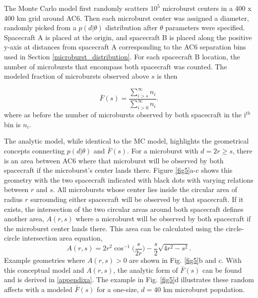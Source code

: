 \documentclass[draft]{agujournal2019}
\begin{document}
The Monte Carlo model first randomly scatters $10^5$ microburst centers in a 400 x 400 km grid around AC6. Then each microburst center was assigned a diameter, randomly picked from a $p(d | \theta)$ distribution after $\theta$ parameters were specified. Spacecraft A is placed at the origin, and spacecraft B is placed along the positive y-axis at distances from spacecraft A corresponding to the AC6 separation bins used in Section \ref{microburst_distribution}. For each spacecraft B location, the number of microbursts that encompass both spacecraft was counted. The modeled fraction of microbursts observed above $s$ is then

\begin{equation}
\bar{F}(s) = \frac{\displaystyle\sum_{i > s}^\infty n_{i} }{ \displaystyle\sum_{i > 0}^\infty n_{i} }.
\end{equation} where as before the number of microbursts observed by both spacecraft in the i$^{th}$ bin is $n_{i}$.

The analytic model, while identical to the MC model, highlights the geometrical concepts connecting $p(d | \theta)$ and $\bar{F}(s)$. For a microburst with $d = 2r \geq s$, there is an area between AC6 where that microburst will be observed by both spacecraft if the microburst's center lands there. Figure \ref{fig5}a-c shows this geometry with the two spacecraft indicated with black dots with varying relations between $r$ and $s$. All microbursts whose center lies inside the circular area of radius $r$ surrounding either spacecraft will be observed by that spacecraft. If it exists, the intersection of the two circular areas around both spacecraft defines another area, $A(r, s)$ where a microburst will be observed by both spacecraft if the microburst center lands there. This area can be calculated using the circle-circle intersection area equation, 
\begin{equation} \label{circle_circle_intersect}
A(r, s) = 2r^2 \cos^{-1}{\Big( \frac{s}{2r} \Big)} - \frac{s}{2} \sqrt{4r^2 - s^2}.
\end{equation} Example geometries where $A(r, s) > 0$ are shown in Fig. \ref{fig5}b and c. With this conceptual model and $A(r, s)$, the analytic form of $\bar{F}(s)$ can be found and is derived in \ref{appendixa}. The example in Fig. \ref{fig5}d illustrates these random affects with a modeled $\bar{F}(s)$ for a one-size, $d=40$ km microburst population.

\end{document}

